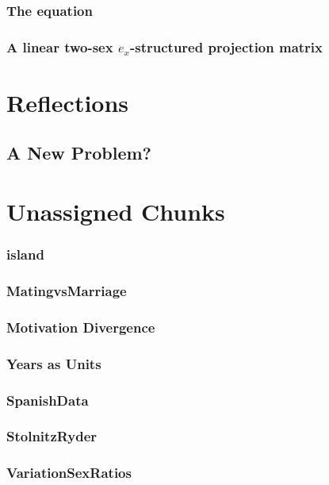     \subsection{The equation}
      
    \subsection{A linear two-sex $e_x$-structured projection matrix}
      


\chapter{Reflections}
  \section{A New Problem?}
    




\chapter{Unassigned Chunks}
\subsection{island}

\subsection{MatingvsMarriage}

\subsection{Motivation Divergence} 

\subsection{Years as Units}

\subsection{SpanishData}
 
\subsection{StolnitzRyder}
 
\subsection{VariationSexRatios}
 
